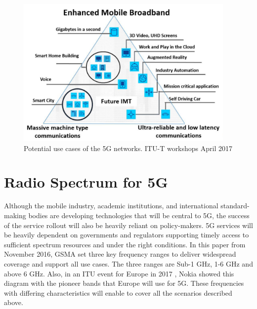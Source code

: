 \begin{itemize}
\begin{figure}[H]
	\begin{Center}
		\includegraphics[width=0.95\textwidth]{./media/image4.png}
		\caption{Potential use cases of the 5G networks. ITU-T workshops April 2017\cite{1-17}}
	\end{Center}
\end{figure}



\end{itemize}
\section{Radio Spectrum for 5G}
Although the mobile industry, academic institutions, and international standard-making bodies are developing technologies that will be central to 5G, the success of the service rollout will also be heavily reliant on policy-makers. 5G services will be heavily dependent on governments and regulators supporting timely access to sufficient spectrum resources and under the right conditions. In this paper \cite{1-19} from November 2016, GSMA set three key frequency ranges to deliver widespread coverage and support all use cases. The three ranges are Sub-1 GHz, 1-6 GHz and above 6 GHz. Also, in an ITU event for Europe in 2017 \cite{1-20}, Nokia showed this diagram with the pioneer bands that Europe will use for 5G. These frequencies with differing characteristics will enable to cover all the scenarios described above.




